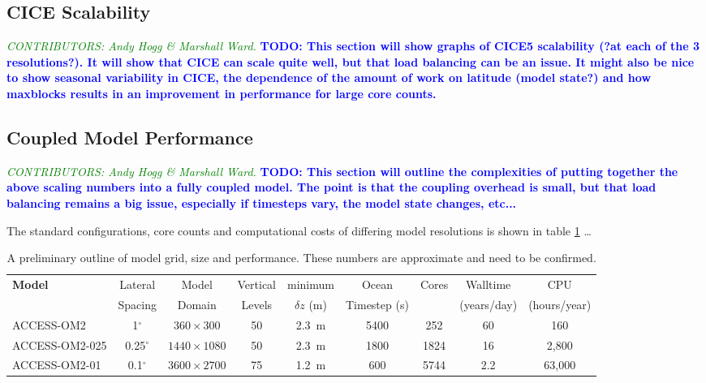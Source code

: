 \documentclass[gmd, manuscript]{copernicus}
\newcommand{\CONTRIBUTORS}[1]{\textcolor{green}{\textsf{\textsl{CONTRIBUTORS: #1}}}}
\newcommand{\TODO}[1]{\textcolor{blue}{\textsf{\textbf{TODO: #1}}}}
\begin{document}
\subsection{CICE Scalability}
\CONTRIBUTORS{Andy Hogg \& Marshall Ward.}
\TODO{This section will show graphs of CICE5  scalability (?at each of the 3 resolutions?). It will show that CICE can scale quite well,  but that load balancing can be an issue. It might also be nice to show seasonal variability in CICE, the dependence of the amount of work on latitude (model state?) and how maxblocks results in an improvement in performance for large core counts.}

\subsection{Coupled Model Performance}
\CONTRIBUTORS{Andy Hogg \& Marshall Ward.}
\TODO{This section will outline the complexities of putting together the above scaling numbers into a fully coupled model. The point is that the coupling overhead is small, but that load balancing remains a big issue, especially if timesteps vary, the model state changes, etc...}

The standard configurations, core counts and computational costs of differing model resolutions is shown in table \ref{tab:perf} \ldots



\begin{table}
\caption{A preliminary outline of model grid, size and performance. These numbers are approximate and need to be confirmed. \label{tab:perf}}
\begin{tabular}{lcccccccc}
\hline
\textbf{Model} & Lateral  & Model & Vertical  & minimum & Ocean & Cores & Walltime & CPU\\
& Spacing & Domain & Levels &  $\delta z$ (m) & Timestep (s)&  & (years/day) & (hours/year)\\
\hline
ACCESS-OM2 & 1$^\circ$ & $360 \times 300$ & 50 & 2.3~m & 5400 & 252 & 60 & 160\\
ACCESS-OM2-025 & 0.25$^\circ$ & $ 1440 \times 1080 $ & 50 & 2.3~m & 1800 & 1824 & 16 & 2,800\\
ACCESS-OM2-01 & 0.1$^\circ$ & $3600 \times 2700$ & 75 & 1.2~m & 600 & 5744 & 2.2  & 63,000\\
\hline
\end{tabular}
\end{table}
\end{document}
